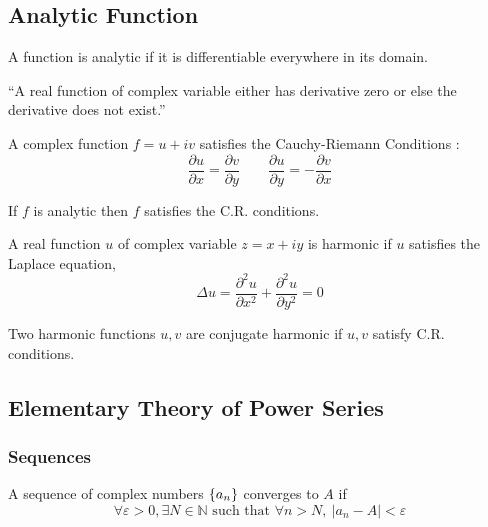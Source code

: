 \subsection{Analytic Function}
\begin{definition}[analytic]
	A function is analytic if it is differentiable everywhere in its domain.
\end{definition}

\begin{important}
	``A real function of complex variable either has derivative zero or else the derivative does not exist.''
\end{important}

\begin{definition}
A complex function $f = u+iv$ satisfies the Cauchy-Riemann Conditions :
\begin{equation}
	\frac{\partial u}{\partial x} = \frac{\partial v}{\partial y} \qquad \frac{\partial u}{\partial y} = -\frac{\partial v}{\partial x}
	\label{eqn:CR}
\end{equation}
\end{definition}

\begin{important}
	If $f$ is analytic then $f$ satisfies the C.R. conditions.
\end{important}

\begin{definition}[harmonic]
	A real function $u$ of complex variable $z = x+iy$ is harmonic if $u$ satisfies the Laplace equation,
\begin{equation}
	\Delta u = \frac{\partial^2 u}{\partial x^2} + \frac{\partial^2 u}{\partial y^2} = 0
	\label{eqn:laplace}
\end{equation}
\end{definition}

\begin{definition}
	Two harmonic functions $u,v$ are conjugate harmonic if $u,v$ satisfy C.R. conditions.
\end{definition}

\subsection{Elementary Theory of Power Series}
\subsubsection{Sequences}
\begin{definition}
	A sequence of complex numbers $\left\{a_n\right\}$ converges to $A$ if \begin{equation}
		\forall\varepsilon > 0, \exists N \in \mathbb{N} \text{ such that }\forall n > N,\ |a_n - A| < \varepsilon
	\end{equation}
\end{definition}

